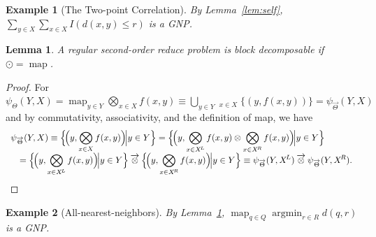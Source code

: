 \documentclass{article}
\newtheorem{lemma}{Lemma}
\newtheorem{example} {Example}
\newcommand{\killspace}{\vspace{-0.08in}}
\newcommand{\GNP}[1][\psi]{{#1}_{\Theta}}
\newcommand{\GNPvec}[1][\psi]{{#1}_{\overrightarrow{\Theta}}}
\newcommand{\otimesvec}{\mathbin{\overrightarrow{\otimes}}}
\newcommand{\bigotimesvec}{\mathop{\overrightarrow{\bigotimes}}}
\DeclareMathOperator*{\argmin}{argmin}
\DeclareMathOperator*{\map}{map}
\newcommand{\kdleft}[1]{#1^{\!L}}
\newcommand{\kdright}[1]{#1^{\!R}}
\begin{document}
\begin{example}[The Two-point Correlation]
  By Lemma~\ref{lem:self}, $\sum_{y \in X} \sum_{x \in X} I(d(x,y)
  \leq r)$ is a GNP.
\end{example}

\begin{lemma}\label{lem:map}
  A regular second-order reduce problem is block decomposable if
  $\odot = \map$.
\end{lemma}
\killspace
\begin{proof}
  For $\GNP(Y,X) = \map_{y \in Y} \bigotimes_{x \in X} f(x,y) \equiv
  \bigcup_{y \in Y} \bigotimesvec_{x \in X} \{(y,f(x,y))\} =
  \GNPvec(Y,X)$ and by commutativity, associativity, and the
  definition of map, we have
  \[ \begin{array}{ll}
    \multicolumn{2}{l}{\displaystyle \GNPvec(Y,X) \equiv \Big\{ \!\Big( y,\bigotimes_{x \in X} f(x,y) \Big)\! \Big| y \in Y \Big\} = \Big\{ \!\Big( y,\bigotimes_{x \in \kdleft{X}} f(x,y) \otimes \bigotimes_{x \in \kdright{X}} f(x,y) \Big)\! \Big| y \in Y \Big\}} \\
    & \displaystyle = \Big\{ \!\Big( y,\bigotimes_{x \in \kdleft{X}} f(x,y) \Big)\! \Big| y \in Y \Big\} \otimesvec \Big\{ \!\Big( y,\bigotimes_{x \in \kdright{X}} f(x,y) \Big)\! \Big| y \in Y \Big\} \equiv \GNPvec(Y,\kdleft{X}) \otimesvec \GNPvec(Y,\kdright{X}).
  \end{array} \]
\end{proof}

\begin{example}[All-nearest-neighbors]
  By Lemma~\ref{lem:map}, $\map_{q \in Q} \argmin_{r \in R} d(q,r)$ is
  a GNP.
\end{example}

\end{document}
